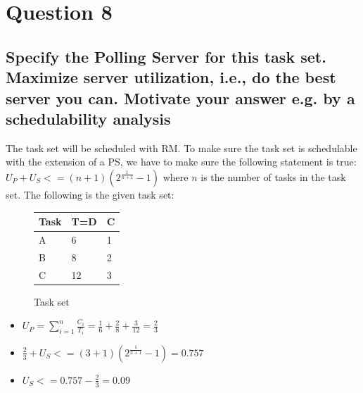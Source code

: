 \section{Question 8}

    \subsection{Specify the Polling Server for this task set. Maximize server utilization, i.e., do the
    best server you can. Motivate your answer e.g. by a schedulability analysis}

        The task set will be scheduled with RM. To make sure the task set is schedulable with the extension of a PS, we have to make sure the following statement is true: $U_P + U_S <= (n+1)(2^{\frac{1}{n+1}} - 1)$ where $n$ is the number of tasks in the task set. 
        The following is the given task set:

        \renewcommand{\arraystretch}{1.4}
            \begin{figure}[H]
            \centering
            \begin{minipage}{0.5\textwidth}
                \begin{table}[H]
                \centering
                \begin{tabular}{|l|l|l|}
                    \hline
                    \textbf{Task}   & \textbf{T=D}  & \textbf{C}  \\ \hline
                    A               & 6             & 1           \\ \hline
                    B               & 8             & 2           \\ \hline
                    C               & 12            & 3           \\ \hline
                \end{tabular}
                \end{table}
            \end{minipage}%
            \caption{Task set}
            \label{fig:Q8tasks}
            \end{figure}
        \renewcommand{\arraystretch}{1.0}


        \begin{itemize}
            \item $U_P = \sum_{i=1}^{n} \frac{C_i}{T_i} = \frac{1}{6} + \frac{2}{8} + \frac{3}{12} = \frac{2}{3}$
            \item $\frac{2}{3} + U_S <= (3+1)(2^{\frac{1}{3+1}} - 1) = 0.757$
            \item $U_S <= 0.757 - \frac{2}{3} = 0.09$
        \end{itemize}

